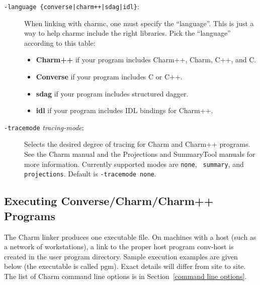 \begin{description}
\item[{\tt -language \{converse|charm++|sdag|idl\}}:]

When linking with charmc, one must specify the ``language''.  This
is just a way to help charmc include the right libraries.  Pick the
``language'' according to this table:

\begin{itemize}
\item{{\bf Charm++} if your program includes Charm++, Charm, C++, and C.}
\item{{\bf Converse} if your program includes C or C++.}
\item{{\bf sdag} if your program includes structured dagger.}
\item{{\bf idl} if your program includes IDL bindings for Charm++.}
\end{itemize}

\item[{\tt -tracemode} {\em tracing-mode}:]

Selects the desired degree of tracing for Charm and Charm++ programs.
See the Charm manual and the Projections and SummaryTool manuals for
more information.  Currently supported modes are {\tt none}, {\tt
summary}, and {\tt projections}. Default is {\tt -tracemode none}.


\end{description}


\subsection[Executing Converse/Charm/Charm++ Programs]
	{Executing Converse/Charm/Charm++ Programs}
\label{executing charm programs}

The Charm linker produces one executable file.  On machines with a host
(such as a network of workstations), a link to the proper host program
{\fexec conv-host} is created in the user program directory.  Sample
execution examples are given below (the executable is called {\fparm
pgm}). Exact details will differ from site to site.  The list of Charm
command line options is in Section~\ref{command line options}.

